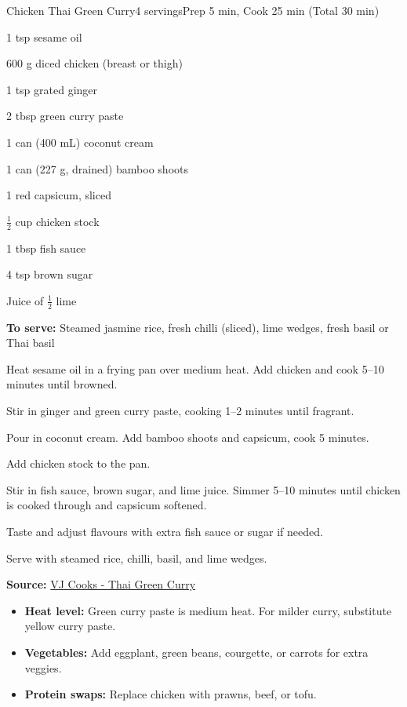 \begin{recipebox}{Chicken Thai Green Curry}{4 servings}{Prep 5 min, Cook 25 min (Total 30 min)}
\begin{ingredients}
  \item 1 tsp sesame oil
  \item 600 g diced chicken (breast or thigh)
  \item 1 tsp grated ginger
  \item 2 tbsp green curry paste
  \item 1 can (400 mL) coconut cream
  \item 1 can (227 g, drained) bamboo shoots
  \item 1 red capsicum, sliced
  \item $\tfrac{1}{2}$ cup chicken stock
  \item 1 tbsp fish sauce
  \item 4 tsp brown sugar
  \item Juice of $\tfrac{1}{2}$ lime
  \item \textbf{To serve:} Steamed jasmine rice, fresh chilli (sliced), lime wedges, fresh basil or Thai basil
\end{ingredients}

\begin{method}
  \item Heat sesame oil in a frying pan over medium heat. Add chicken and cook 5--10 minutes until browned.
  \item Stir in ginger and green curry paste, cooking 1--2 minutes until fragrant.
  \item Pour in coconut cream. Add bamboo shoots and capsicum, cook 5 minutes.
  \item Add chicken stock to the pan.
  \item Stir in fish sauce, brown sugar, and lime juice. Simmer 5--10 minutes until chicken is cooked through and capsicum softened.
  \item Taste and adjust flavours with extra fish sauce or sugar if needed.
  \item Serve with steamed rice, chilli, basil, and lime wedges.
\end{method}

\textbf{Source:} \href{https://vjcooks.com/chicken-thai-green-curry/#mv-creation-759-jtr}{VJ Cooks - Thai Green Curry}

\begin{notes}
\begin{itemize}
  \item \textbf{Heat level:} Green curry paste is medium heat. For milder curry, substitute yellow curry paste.
  \item \textbf{Vegetables:} Add eggplant, green beans, courgette, or carrots for extra veggies.
  \item \textbf{Protein swaps:} Replace chicken with prawns, beef, or tofu.
\end{itemize}
\end{notes}
\end{recipebox}
